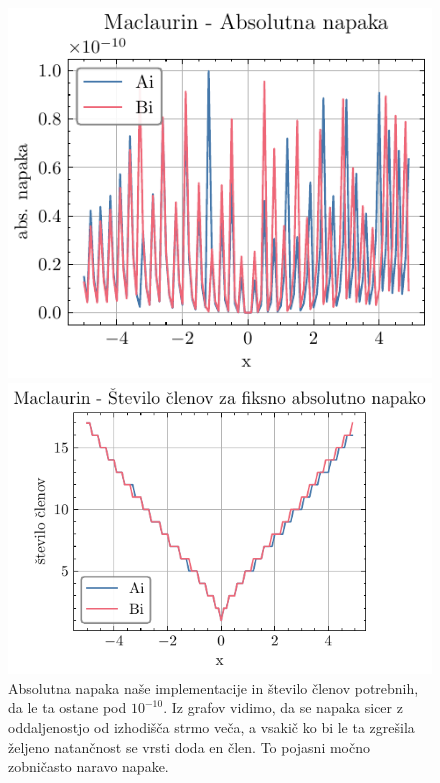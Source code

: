 \documentclass[slovene,11pt,a4paper]{article}
\begin{document}
\begin{figure}[ht]
  \centering
  \begin{minipage}{0.42\textwidth}
    \centering
    \includegraphics[width=\linewidth]{graphs/mac_abs_err.pdf}
  \end{minipage}\hfill
  \begin{minipage}{0.48\textwidth}
    \centering
    \includegraphics[width=\linewidth]{graphs/mac_abs_err_n.pdf}
  \end{minipage}
  \caption{Absolutna napaka naše implementacije in število členov potrebnih, da le ta ostane pod $10^{-10}$. Iz grafov vidimo, da se napaka sicer z oddaljenostjo od izhodišča strmo veča, a vsakič ko bi le ta zgrešila željeno natančnost se vrsti doda en člen. To pojasni močno zobničasto naravo napake.}
  \label{fig: mac_abs_err}
\end{figure}
\end{document}
